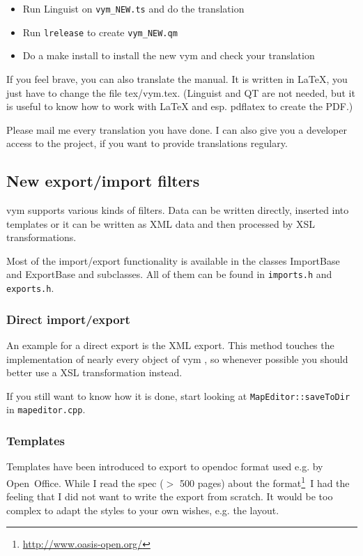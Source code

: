 \documentclass[12pt,a4paper]{article}
\newcommand{\vym}{{\sc vym }}
\begin{document}
\begin{appendix}
\begin{itemize}
    \item Run Linguist on {\tt vym\_NEW.ts} and do the translation

    \item Run {\tt lrelease} to create {\tt vym\_NEW.qm}

    \item Do a make install to install the new vym and check your translation
\end{itemize}

If you feel brave, you can also translate the manual. It is written in
LaTeX, you just have to change the file tex/vym.tex. (Linguist and QT
are not needed, but it is useful to know how to work with LaTeX and esp.
pdflatex to create the PDF.) 

Please mail me every translation you have done. I can also give you a
developer access to the project, if you want to provide translations
regulary.  

\subsection{New export/import filters}
\vym supports various kinds of filters. Data can be written directly,
inserted into templates or it can be written as XML data and then
processed by XSL transformations. 

Most of the import/export functionality is available in the classes
ImportBase and ExportBase and subclasses. All of them can be found in
{\tt imports.h} and {\tt exports.h}.

\subsubsection*{Direct import/export}
An example for a direct export is the XML export. This method touches
the implementation of nearly every object of \vym, so whenever possible
you should better use a XSL transformation instead.

If you still want to know how it is done, start looking at 
{\tt MapEditor::saveToDir} in {\tt mapeditor.cpp}.

\subsubsection*{Templates}
Templates have been introduced to export to opendoc format used e.g. by
Open~Office. While I read the spec ($>$ 500 pages) about the format\footnote{
\href{http://www.oasis-open.org/}{http://www.oasis-open.org/}}\ 
I had the feeling that I did not want to write the export from scratch. 
It would be too complex to adapt the styles to your own wishes, e.g. the
layout.


\end{appendix}
\end{document}
